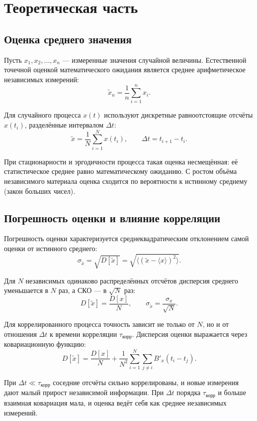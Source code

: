 \section{Теоретическая часть}

\subsection{Оценка среднего значения}

Пусть $x_1, x_2, \dots, x_n$ --- измеренные значения случайной величины. Естественной точечной оценкой математического ожидания является среднее арифметическое независимых измерений:
\[
	\tilde{x}_n = \frac{1}{n} \sum_{i=1}^{n} x_i .
\]

Для случайного процесса $x(t)$ используют дискретные равноотстоящие отсчёты $x(t_i)$, разделённые интервалом $\Delta t$:
\[
	\tilde{x} = \frac{1}{N} \sum_{i=1}^{N} x(t_i), \qquad \Delta t = t_{i+1} - t_i .
\]

При стационарности и эргодичности процесса такая оценка несмещённая: её статистическое среднее равно математическому ожиданию. С ростом объёма независимого материала оценка сходится по вероятности к истинному среднему (закон больших чисел).

\subsection{Погрешность оценки и влияние корреляции}

Погрешность оценки характеризуется среднеквадратическим отклонением самой оценки от истинного среднего:
\[
	\sigma_{\tilde{x}} = \sqrt{D[\tilde{x}]} = \sqrt{\big\langle (\tilde{x} - \langle x \rangle)^2 \big\rangle} .
\]

Для $N$ независимых одинаково распределённых отсчётов дисперсия среднего уменьшается в $N$ раз, а СКО --- в $\sqrt{N}$ раз:
\[
	D[\tilde{x}] = \frac{D[x]}{N}, \qquad \sigma_{\tilde{x}} = \frac{\sigma_x}{\sqrt{N}} .
\]

Для коррелированного процесса точность зависит не только от $N$, но и от отношения $\Delta t$ к времени корреляции $\tau_\text{корр}$. Дисперсия оценки выражается через ковариационную функцию:
\[
	D[\tilde{x}] = \frac{D[x]}{N} + \frac{1}{N^2} \sum_{i=1}^{N} \sum_{j \neq i} B'_x(t_i - t_j) .
\]

При $\Delta t \ll \tau_\text{корр}$ соседние отсчёты сильно коррелированы, и новые измерения дают малый прирост независимой информации. При $\Delta t$ порядка $\tau_\text{корр}$ и больше взаимная ковариация мала, и оценка ведёт себя как среднее независимых измерений.


